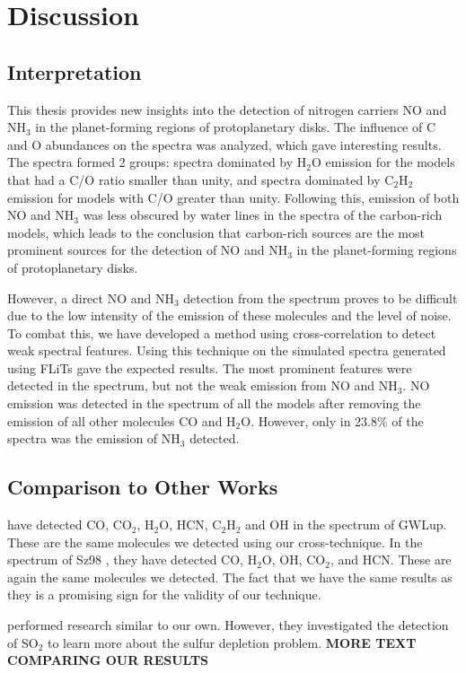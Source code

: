\documentclass[twoside, single, authoryear, semicolon, 12pt]{lion-msc}
\newcommand{\4}{$_4$}
\newcommand{\3}{$_3$}
\newcommand{\2}{$_2$}
\begin{document}
\chapter{Discussion}\label{Ch: Discussion}
\section{Interpretation}
This thesis provides new insights into the detection of nitrogen carriers NO and NH\3 in the planet-forming regions of protoplanetary disks. The influence of C and O abundances on the spectra was analyzed, which gave interesting results. The spectra formed 2 groups: spectra dominated by H\2O emission for the models that had a C/O ratio smaller than unity, and spectra dominated by C\2H\2 emission for models with C/O greater than unity. Following this, emission of both NO and NH\3 was less obscured by water lines in the spectra of the carbon-rich models, which leads to the conclusion that carbon-rich sources are the most prominent sources for the detection of NO and NH\3 in the planet-forming regions of protoplanetary disks. 

However, a direct NO and NH\3 detection from the spectrum proves to be difficult due to the low intensity of the emission of these molecules and the level of noise. To combat this, we have developed a method using cross-correlation to detect weak spectral features. Using this technique on the simulated spectra generated using FLiTs gave the expected results. The most prominent features were detected in the spectrum, but not the weak emission from NO and NH\3. NO emission was detected in the spectrum of all the models after removing the emission of all other molecules CO and H\2O. However, only in 23.8\% of the spectra was the emission of NH\3 detected.


\section{Comparison to Other Works}
\cite{Grant_2023} have detected CO, CO\2, H\2O, HCN, C\2H\2 and OH in the spectrum of GWLup. These are the same molecules we detected using our cross-technique. In the spectrum of Sz98 \cite{Gasman_2023}, they have detected CO, H\2O, OH, CO\2, and HCN. These are again the same molecules we detected. The fact that we have the same results as they is a promising sign for the validity of our technique. 

\cite{groningenthesis} performed research similar to our own. However, they investigated the detection of SO\2 to learn more about the sulfur depletion problem. \textbf{MORE TEXT COMPARING OUR RESULTS}
\end{document}
